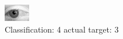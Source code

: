 \begin{figure}[h!]
\begin{center}
\includegraphics[width=0.60\columnwidth]{figures/ID2792_class_4_target_3.png}
\end{center}
\caption{ Classification: 4 actual target: 3}
\label{fig:ID2792_class_4_target_3}
\end{figure}
